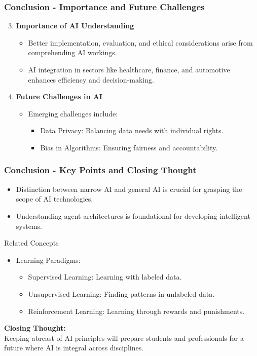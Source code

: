 \documentclass[aspectratio=169]{beamer}
\begin{document}
\begin{frame}[fragile]
    \frametitle{Conclusion - Importance and Future Challenges}
    \begin{enumerate}
        \setcounter{enumi}{2}
        \item \textbf{Importance of AI Understanding}
        \begin{itemize}
            \item Better implementation, evaluation, and ethical considerations arise from comprehending AI workings.
            \item AI integration in sectors like healthcare, finance, and automotive enhances efficiency and decision-making.
        \end{itemize}

        \item \textbf{Future Challenges in AI}
        \begin{itemize}
            \item Emerging challenges include:
            \begin{itemize}
                \item Data Privacy: Balancing data needs with individual rights.
                \item Bias in Algorithms: Ensuring fairness and accountability.
            \end{itemize}
        \end{itemize}
    \end{enumerate}
\end{frame}

\begin{frame}[fragile]
    \frametitle{Conclusion - Key Points and Closing Thought}
    \begin{itemize}
        \item Distinction between narrow AI and general AI is crucial for grasping the scope of AI technologies.
        \item Understanding agent architectures is foundational for developing intelligent systems.
    \end{itemize}
    
    \begin{block}{Related Concepts}
        \begin{itemize}
            \item Learning Paradigms:
            \begin{itemize}
                \item Supervised Learning: Learning with labeled data.
                \item Unsupervised Learning: Finding patterns in unlabeled data.
                \item Reinforcement Learning: Learning through rewards and punishments.
            \end{itemize}
        \end{itemize}
    \end{block}
    
    \textbf{Closing Thought:} \\
    Keeping abreast of AI principles will prepare students and professionals for a future where AI is integral across disciplines.
\end{frame}
\end{document}
